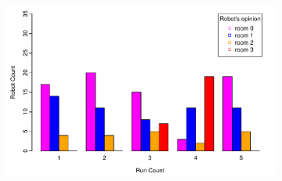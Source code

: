 \documentclass{llncs}
\begin{document}
\begin{figure}[h!]
\begin{subfigure}[b]{0.25\textwidth}
                \label{fig:eval1}
        \end{subfigure}%
        \qquad
        \begin{subfigure}[b]{0.67\textwidth}
                \includegraphics[width=\textwidth]{PLOT/EXP/exp7}
                \label{fig:exp1}
        \end{subfigure}
        

\end{figure}
\end{document}
